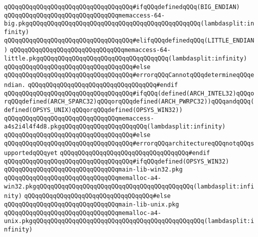 \newline
\verb|qQQqqQQqqQQqqQQqqQQqqQQqqQQqqQQqqQQq#ifqQQqdefinedqQQq(BIG_ENDIAN)|\newline
\verb|qQQqqQQqqQQqqQQqqQQqqQQqqQQqqQQqmemaccess-64-big.pkgqQQqqQQqqQQqqQQqqQQqqQQqqQQqqQQqqQQqqQQqqQQqqQQq(lambdasplit:infinity)|\newline
\verb|qQQqqQQqqQQqqQQqqQQqqQQqqQQqqQQqqQQq#elifqQQqdefinedqQQq(LITTLE_ENDIAN)|\newline
\verb|qQQqqQQqqQQqqQQqqQQqqQQqqQQqqQQqmemaccess-64-little.pkgqQQqqQQqqQQqqQQqqQQqqQQqqQQqqQQqqQQq(lambdasplit:infinity)|\newline
\verb|qQQqqQQqqQQqqQQqqQQqqQQqqQQqqQQqqQQq#else|\newline
\verb|qQQqqQQqqQQqqQQqqQQqqQQqqQQqqQQqqQQq#errorqQQqCannotqQQqdetermineqQQqendian.|\newline
\verb|qQQqqQQqqQQqqQQqqQQqqQQqqQQqqQQqqQQq#endif|\newline
\newline
\verb|qQQqqQQqqQQqqQQqqQQqqQQqqQQqqQQqqQQq#ifqQQq(defined(ARCH_INTEL32)qQQqorqQQqdefined(ARCH_SPARC32)qQQqorqQQqdefined(ARCH_PWRPC32))qQQqandqQQq(defined(OPSYS_UNIX)qQQqorqQQqdefined(OPSYS_WIN32))|\newline
\newline
\verb|qQQqqQQqqQQqqQQqqQQqqQQqqQQqqQQqmemaccess-a4s2i4l4f4d8.pkgqQQqqQQqqQQqqQQqqQQqqQQq(lambdasplit:infinity)|\newline
\verb|qQQqqQQqqQQqqQQqqQQqqQQqqQQqqQQqqQQq#else|\newline
\verb|qQQqqQQqqQQqqQQqqQQqqQQqqQQqqQQqqQQq#errorqQQqarchitectureqQQqnotqQQqsupportedqQQqyet|\newline
\verb|qQQqqQQqqQQqqQQqqQQqqQQqqQQqqQQqqQQq#endif|\newline
\newline
\newline
\verb|qQQqqQQqqQQqqQQqqQQqqQQqqQQqqQQqqQQq#ifqQQqdefined(OPSYS_WIN32)|\newline
\verb|qQQqqQQqqQQqqQQqqQQqqQQqqQQqqQQqmain-lib-win32.pkg|\newline
\verb|qQQqqQQqqQQqqQQqqQQqqQQqqQQqqQQqmemalloc-a4-win32.pkgqQQqqQQqqQQqqQQqqQQqqQQqqQQqqQQqqQQqqQQqqQQq(lambdasplit:infinity)|\newline
\verb|qQQqqQQqqQQqqQQqqQQqqQQqqQQqqQQqqQQq#else|\newline
\verb|qQQqqQQqqQQqqQQqqQQqqQQqqQQqqQQqmain-lib-unix.pkg|\newline
\verb|qQQqqQQqqQQqqQQqqQQqqQQqqQQqqQQqmemalloc-a4-unix.pkgqQQqqQQqqQQqqQQqqQQqqQQqqQQqqQQqqQQqqQQqqQQqqQQq(lambdasplit:infinity)|\newline
